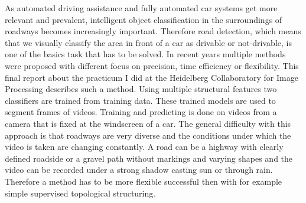 As automated driving assistance and fully automated car systems get more relevant and prevalent, intelligent object classification in the surroundings of roadways becomes increasingly important. Therefore road detection, which means that we visually classify the area in front of a car as drivable or not-drivable, is one of the basics task that has to be solved. In recent years multiple methods were proposed with different focus on precision, time efficiency or flexibility. This final report about the practicum I did at the Heidelberg Collaboratory for Image Processing describes such a method. Using multiple structural features two classifiers are trained from training data. These trained models are used to segment frames of videos. Training and predicting is done on videos from a camera that is fixed at the windscreen of a car. The general difficulty with this approach is that roadways are very diverse and the conditions under which the video is taken are changing constantly. A road can be a highway with clearly defined roadside or a gravel path without markings and varying shapes and the video can be recorded under a strong shadow casting sun or through rain. Therefore a method has to be more flexible successful then with for example simple supervised topological structuring.